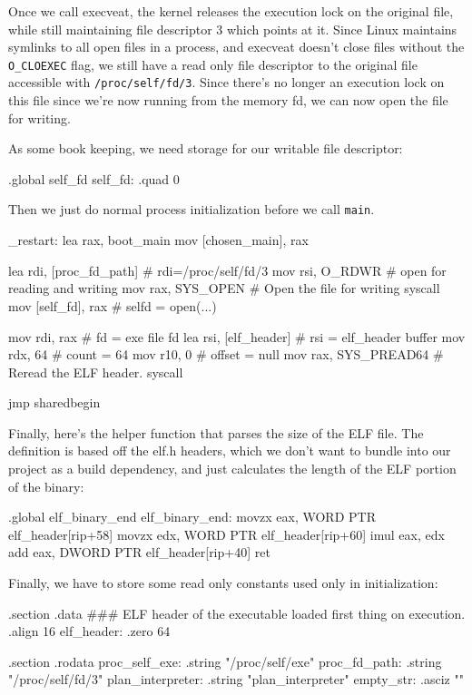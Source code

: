 Once we call execveat, the kernel releases the execution lock on the original
file, while still maintaining file descriptor 3 which points at it. Since Linux
maintains symlinks to all open files in a process, and execveat doesn't close
files without the \lstinline|O_CLOEXEC| flag, we still have a read only file
descriptor to the original file accessible
with \lstinline|/proc/self/fd/3|. Since there's no longer an execution lock on
this file since we're now running from the memory fd, we can now open the file
for writing.

As some book keeping, we need storage for our writable file descriptor:

\begin{asmdata}
.global self_fd
self_fd:	.quad 0
\end{asmdata}

Then we just do normal process initialization before we call \lstinline|main|.

\begin{asm}
_restart:
	lea	rax, boot_main
	mov	[chosen_main], rax

	lea	rdi, [proc_fd_path]	# rdi=/proc/self/fd/3
	mov	rsi, O_RDWR		# open for reading and writing
	mov	rax, SYS_OPEN		# Open the file for writing
	syscall
	mov	[self_fd], rax		# selfd = open(...)

	mov	rdi, rax		# fd = exe file fd
	lea	rsi, [elf_header]	# rsi = elf_header buffer
	mov	rdx, 64			# count = 64
	mov	r10, 0			# offset = null
	mov	rax, SYS_PREAD64	# Reread the ELF header.
	syscall

	jmp	sharedbegin
\end{asm}

Finally, here's the helper function that parses the size of the ELF file. The
definition is based off the elf.h headers, which we don't want to bundle into
our project as a build dependency, and just calculates the length of the ELF
portion of the binary:

\begin{asm}
.global elf_binary_end
elf_binary_end:
	movzx   eax, WORD PTR elf_header[rip+58]
	movzx   edx, WORD PTR elf_header[rip+60]
	imul	eax, edx
	add     eax, DWORD PTR elf_header[rip+40]
	ret
\end{asm}

Finally, we have to store some read only constants used only in initialization:

\begin{asmdata}
.section .data
### ELF header of the executable loaded first thing on execution.
.align 16
elf_header:
	.zero	64

.section .rodata
proc_self_exe:
    .string "/proc/self/exe"
proc_fd_path:
    .string "/proc/self/fd/3"
plan_interpreter:
    .string "plan_interpreter"
empty_str:
    .asciz ""
\end{asmdata}

